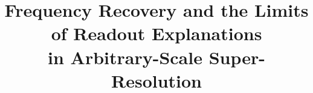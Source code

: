 \documentclass{article}
\title{Frequency Recovery and the Limits of Readout Explanations\\
in Arbitrary-Scale Super-Resolution}
\begin{document}
\maketitle

\clearpage
\balance


\end{document}
